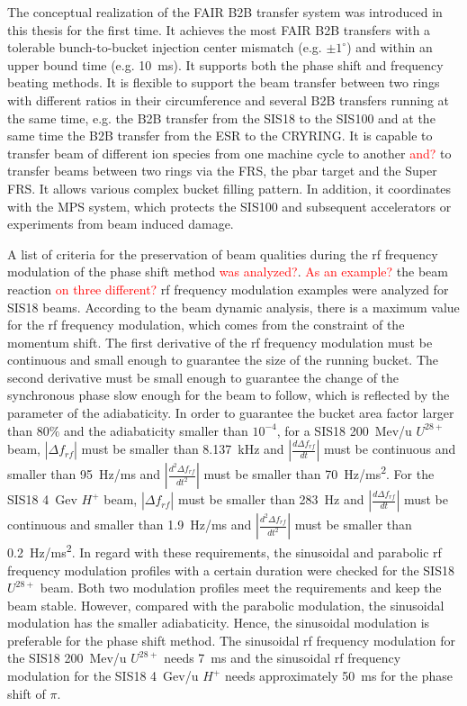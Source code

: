 
The conceptual realization of the FAIR B2B transfer system was introduced in this thesis for the first time. It achieves the most FAIR B2B transfers with a tolerable bunch-to-bucket injection center mismatch (e.g. $\pm 1^\circ$) and within an upper bound time (e.g. \SI{10}{\ms}). It supports both the phase shift and frequency beating methods. It is flexible to support the beam transfer between two rings with different ratios in their circumference and several B2B transfers running at the same time, e.g. the B2B transfer from the SIS18 to the SIS100 and at the same time the B2B transfer from the ESR to the CRYRING. It is capable to transfer beam of different ion species from one machine cycle to another \textcolor{red}{and?} to transfer beams between two rings via the FRS, the pbar target and the Super FRS. It allows various complex bucket filling pattern. In addition, it coordinates with the MPS system, which protects the SIS100 and subsequent accelerators or experiments from beam induced damage. 

A list of criteria for the preservation of beam qualities during the rf frequency modulation of the phase shift method \textcolor{red}{was analyzed?}. \textcolor{red}{As an example?} the beam reaction \textcolor{red}{on three different?} rf frequency modulation examples were analyzed for SIS18 beams. According to the beam dynamic analysis, there is a maximum value for the rf frequency modulation, which comes from the constraint of the momentum shift. The first derivative of the rf frequency modulation must be continuous and small enough to guarantee the size of the running bucket. The second derivative must be small enough to guarantee the change of the synchronous phase slow enough for the beam to follow, which is reflected by the parameter of the adiabaticity. In order to guarantee the bucket area factor larger than $80\%$ and the adiabaticity smaller than $10^{-4}$, for a SIS18 \SI{200}{Mev/u} $U^{28+}$ beam, $|\Delta f_{\mathit{rf}}|$ must be smaller than \SI{8.137}{kHz} and $|\frac{d\Delta f_{\mathit{rf}}}{dt}|$ must be continuous and smaller than \SI{95}{Hz/ms} and $|\frac{d^2\Delta f_{\mathit{rf}}}{dt^2}|$ must be smaller than \SI{70}{Hz/ms^2}. For the SIS18 \SI{4}{Gev} $H^{+}$ beam, $|\Delta f_{\mathit{rf}}|$ must be smaller than \SI{283}{Hz} and $|\frac{d\Delta f_{\mathit{rf}}}{dt}|$ must be continuous and smaller than \SI{1.9}{Hz/ms} and $|\frac{d^2\Delta f_{\mathit{rf}}}{dt^2}|$ must be smaller than \SI{0.2}{Hz/ms^2}.  In regard with these requirements, the sinusoidal and parabolic rf frequency modulation profiles with a certain duration were checked for the SIS18 $U^{28+}$ beam. Both two modulation profiles meet the requirements and keep the beam stable. However, compared with the parabolic modulation, the sinusoidal modulation has the smaller adiabaticity. Hence, the sinusoidal modulation is preferable for the phase shift method. The sinusoidal rf frequency modulation for the SIS18 \SI{200}{Mev/u} $U^{28+}$ needs \SI{7}{\ms} and the sinusoidal rf frequency modulation for the SIS18 \SI{4}{Gev/u} $H^{+}$ needs approximately \SI{50}{\ms} for the phase shift of $\pi$. 

